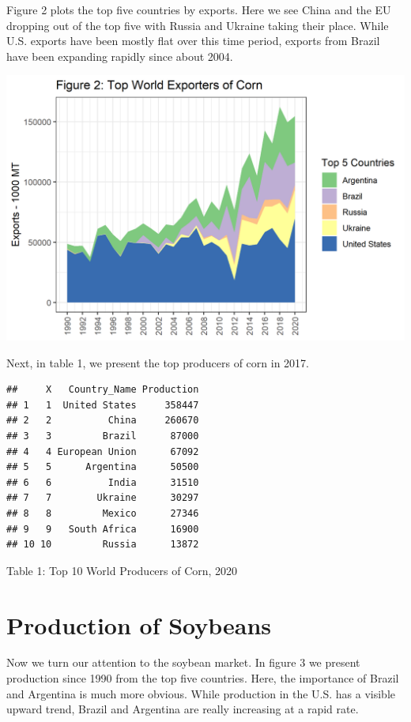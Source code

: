 \documentclass[
]{book}
\begin{document}
Figure 2 plots the top five countries by exports. Here we see China and the EU dropping out of the top five with Russia and Ukraine taking their place. While U.S. exports have been mostly flat over this time period, exports from Brazil have been expanding rapidly since about 2004.

\includegraphics{assets/SouthAmericanProduction_TopExporterCorn.png}

Next, in table 1, we present the top producers of corn in 2017.

\begin{verbatim}
##     X   Country_Name Production
## 1   1  United States     358447
## 2   2          China     260670
## 3   3         Brazil      87000
## 4   4 European Union      67092
## 5   5      Argentina      50500
## 6   6          India      31510
## 7   7        Ukraine      30297
## 8   8         Mexico      27346
## 9   9   South Africa      16900
## 10 10         Russia      13872
\end{verbatim}

Table 1: Top 10 World Producers of Corn, 2020

\hypertarget{production-of-soybeans}{%
\section{Production of Soybeans}\label{production-of-soybeans}}

Now we turn our attention to the soybean market. In figure 3 we present production since 1990 from the top five countries. Here, the importance of Brazil and Argentina is much more obvious. While production in the U.S. has a visible upward trend, Brazil and Argentina are really increasing at a rapid rate.
\end{document}
